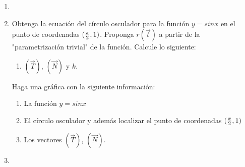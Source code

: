 \documentclass[10pt,letterpaper,fleqn]{article}
\begin{document}
\begin{enumerate}
        \item

        \item Obtenga la ecuación del círculo osculador para la función $y=sin x$ en el punto de coordenadas $({\pi \over 2},1)$. Proponga $r(\overrightarrow{t})$ a partir de la "parametrización trivial" de la función. Calcule lo siguiente: 
        \begin{enumerate}
            \item $(\overrightarrow{T})$, $(\overrightarrow{N})$ y $k$.
        \end{enumerate}
        Haga una gráfica con la siguiente información:
        \begin{enumerate}
            \item La función $y=sin x$
            \item El círculo osculador y además localizar el punto de coordenadas $({\pi \over 2},1)$
            \item Los vectores $(\overrightarrow{T})$, $(\overrightarrow{N})$.
        \end{enumerate}

        \item 


    \end{enumerate}
\end{document}

